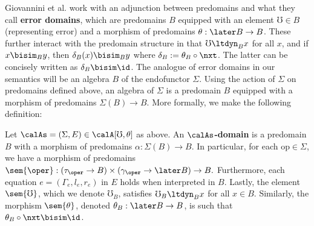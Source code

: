\documentclass[acmsmall,screen,review,anonymous]{acmart}
\theoremstyle{remark}
\begin{document}
Giovannini et al. work with an adjunction between predomains and what they call
\textbf{error domains}, which are predomains $B$ equipped with an element $\mho
\in B$ (representing error) and a morphism of predomains $\theta : \later B \to
B$. These further interact with the predomain structure in that $\mho \ltdyn_B
x$ for all $x$, and if $x \bisim_{B} y$, then $\delta_B(x) \bisim_{B} y$ where
$\delta_B := \theta_B \circ \nxt$. The latter can be concisely written as
$\delta_B \bisim \id$.
%
The analogue of error domains in our semantics will be an algebra $B$ of the
endofunctor $\Sigma$. Using the action of $\Sigma$ on predomains defined above,
an algebra of $\Sigma$ is a predomain $B$ equipped with a morphism of predomains
$\Sigma(B) \to B$. 
%
More formally, we make the following definition:
%
\begin{definition}\label{def:sigma-domain} 
  
  Let $\calAs = (\Sigma, E) \in \calA[\mho, \theta]$ as above. An
  \textbf{$\calAs$-domain} is a predomain $B$ with a morphism of predomains
  $\alpha : \Sigma(B) \to B$. In particular, for each $\text{op} \in
  \Sigma$, we have a morphism of predomains
  $\sem{\oper} : (\tau_\oper \to B) \times (\gamma_\oper \to \later B) \to B.$
  Furthermore, each equation $e = (\Gamma_e, l_e, r_e)$ in $E$ holds when
  interpreted in $B$.
  Lastly, the element $\sem{\mho}$, which we denote $\mho_B$, satisfies $\mho_B
  \ltdyn_B x$ for all $x \in B$. Similarly, the morphism $\sem{\theta}$, denoted
  $\theta_B : \later B \to B$, is such that $\theta_B \circ \nxt \bisim \id$.
\end{definition}
\end{document}
